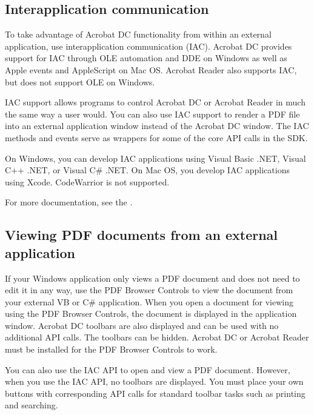 \documentclass[letterpaper,12pt,english,openany,oneside]{sphinxmanual}
\begin{document}
\subsection{Interapplication communication}
\label{\detokenize{index:interapplication-communication}}
To take advantage of Acrobat DC functionality from within an external application, use interapplication communication (IAC). Acrobat DC provides support for IAC through OLE automation and DDE on Windows as well as Apple events and AppleScript on Mac OS. Acrobat Reader also supports IAC, but does not support OLE on Windows.

IAC support allows programs to control Acrobat DC or Acrobat Reader in much the same way a user would. You can also use IAC support to render a PDF file into an external application window instead of the Acrobat DC window. The IAC methods and events serve as wrappers for some of the core API calls in the SDK.

On Windows, you can develop IAC applications using Visual Basic .NET, Visual C++ .NET, or Visual C\# .NET. On Mac OS, you develop IAC applications using Xcode. CodeWarrior is not supported.

For more documentation, see the  .


\subsection{Viewing PDF documents from an external application}
\label{\detokenize{index:viewing-pdf-documents-from-an-external-application}}
If your Windows application only views a PDF document and does not need to edit it in any way, use the PDF Browser Controls to view the document from your external VB or C\# application. When you open a document for viewing using the PDF Browser Controls, the document is displayed in the application window. Acrobat DC toolbars are also displayed and can be used with no additional API calls. The toolbars can be hidden. Acrobat DC or Acrobat Reader must be installed for the PDF Browser Controls to work.

You can also use the IAC API to open and view a PDF document. However, when you use the IAC API, no toolbars are displayed. You must place your own buttons with corresponding API calls for standard toolbar tasks such as printing and searching.
\end{document}
